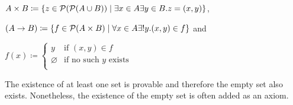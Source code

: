 \begin{boxdef}
\begin{defi}
\begin{enumerate}
        $A \times B \coloneq \{ z \in \mathcal{P}(\mathcal{P}(A \cup B)) \mid \exists x \in A \exists y \in B. z = (x, y)\}$, 
        
        $(A \to B) \coloneq \{f \in \mathcal{P}(A \times B) \mid \forall x \in A \exists! y. (x, y) \in f \}$ and
        
        $f(x) \coloneq 
        \begin{cases}
            y & \text{if } (x, y) \in f \\
            \varnothing & \text{if no such $y$ exists} \\
        \end{cases}$
    \end{enumerate}
\end{defi}
\end{boxdef}

\begin{rem}
    The existence of at least one set is provable and therefore the empty set also exists. 
    Nonetheless, the existence of the empty set is often added as an axiom.
\end{rem}
